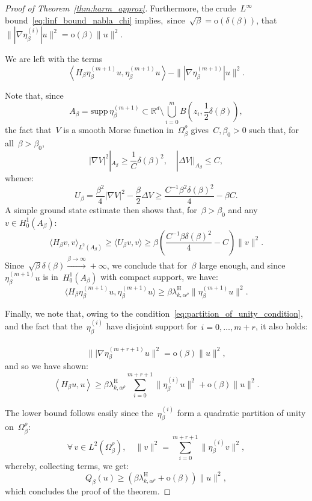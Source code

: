 \documentclass[10pt]{article}
\newcommand{\R}{\mathbb{R}}
\newcommand{\1}{\mathbbm 1}
\newcommand{\supp}{\mathrm{supp}}
\newcommand{\largeRadius}{\delta}
\newcommand{\shift}{\rho} %
\renewcommand{\o}{\mathrm{o}}
\begin{document}
\begin{proof}[Proof of Theorem~\ref{thm:harm_approx}]
        Furthermore, the crude~$L^\infty$ bound~\eqref{eq:linf_bound_nabla_chi} implies,~since~$\sqrt\beta = \o\left(\largeRadius(\beta)\right)$, that~$\||\nabla\eta_\beta^{(i)}|u\|^2 = \o(\beta)\|u\|^2$.

        We are left with the terms
        \[\left\langle H_\beta \eta_\beta^{(m+1)}u,\eta_\beta^{(m+1)}u\right\rangle - \||\nabla \eta_\beta^{(m+1)}|u\|^2.\]

        Note that, since
       ~$$ A_\beta = \supp\,\eta_\beta^{(m+1)} \subset \R^d\setminus \bigcup_{i=0}^m B\left(z_i,\frac12\largeRadius(\beta)\right),$$
        the fact that~$V$ is a smooth Morse function in~$ \Omega_\beta^\shift$ gives~$C,\beta_0>0$ such that, for all~$\beta>\beta_0$,
        \[|\nabla V|^2 |_{A_\beta} \geq \frac1C\largeRadius(\beta)^2,\quad |\Delta V| |_{A_\beta} \leq C,\]
        whence:
        \[U_\beta=\frac{\beta^2}4|\nabla V|^2 -\frac\beta 2 \Delta V \geq  \frac{C^{-1}\beta^2 \largeRadius(\beta)^2}{4}-\beta C.\]
        A simple ground state estimate then shows that, for~$\beta>\beta_0$ and any $v\in H_0^1(A_\beta)$:
        \[\langle H_\beta v,v\rangle_{L^2(A_\beta)} \geq \langle U_\beta v,v\rangle \geq \beta\left(\frac{C^{-1}\beta\largeRadius(\beta)^2}{4}-C\right)\|v\|^2.\]
        Since~$\sqrt\beta\largeRadius(\beta)\xrightarrow{\beta\to\infty}+\infty$, we conclude that for~$\beta$ large enough, and since~$\eta_\beta^{(m+1)}u$ is in~$H_0^1(A_\beta)$ with compact support, we have:
        \[\langle H_\beta \eta_\beta^{(m+1)}u,\eta_\beta^{(m+1)}u\rangle \geq \beta\lambda_{k,\alpha^\shift}^{\mathrm{H}}\|\eta_\beta^{(m+1)}u\|^2.\]

        Finally, we note that, owing to the condition~\eqref{eq:partition_of_unity_condition}, and the fact that the~$\eta_\beta^{(i)}$ have disjoint support for~$i=0,\dots,m+r$, it also holds:
       ~$$\||\nabla \eta_\beta^{(m+r+1)}u\|^2 = \o(\beta)\|u\|^2,$$
        and so we have shown:
        \begin{equation}
            \left\langle H_\beta u,u \right\rangle \geq \beta\lambda_{k,\alpha^\shift}^{\mathrm H} \sum_{i=0}^{m+r+1}\|\eta_\beta^{(i)}u\|^2 + \mathrm o(\beta)\|u\|^2.
        \end{equation}

        The lower bound follows easily since the~$\eta_\beta^{(i)}$ form a quadratic partition of unity on~$\Omega_\beta^\shift$:
       ~$$\forall\,v\in L^2(\Omega_\beta^\shift),\quad\|v\|^2 = \sum_{i=0}^{m+r+1} \|\eta_\beta^{(i)}v\|^2,$$
       whereby, collecting terms, we get:
       \[Q_\beta(u) \geq (\beta\lambda_{k,\alpha^\shift}^{\mathrm{H}} + \o(\beta))\|u\|^2,\]
        which concludes the proof of the theorem.
    \end{proof}
\end{document}
